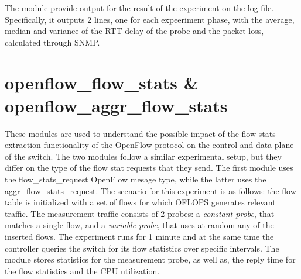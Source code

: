 \documentclass{book}
\begin{document}
The module provide output for the result of the experiment on the log file. 
Specifically, it outputs 2 lines, one for each expeeriment phase, with the average, median 
and variance of the RTT delay of the probe and the packet
loss, calculated through SNMP. 

\section{openflow\_flow\_stats \& openflow\_aggr\_flow\_stats}

These modules are used to understand the possible impact of the flow stats
extraction functionality of the OpenFlow protocol on the control and data plane of the
switch. The two modules follow a similar experimental setup, but they differ on
the type of the flow stat requests that they send. The first module uses the
flow\_stats\_request OpenFlow mesage type, while the latter uses the
aggr\_flow\_stats\_request. 
The scenario for this experiment is as follows: the flow table is
initialized with a set of flows for which OFLOPS generates relevant traffic. 
The measurement traffic consists of 2 probes: a \emph{constant probe}, that
matches a single flow, and a \emph{variable probe}, that uses at
random any of the inserted flows. The experiment runs for 1 minute and at 
the same time the controller queries the switch for its flow statistics over 
specific intervals. The module stores statistics for the measurement probe, as
well as, the reply time for the flow statistics and the CPU utilization. 
\end{document}
